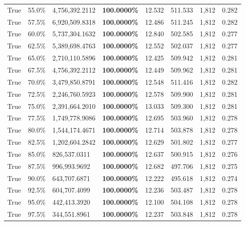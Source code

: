 \begin{table}[H]
\begin{tabular}{lllrllll}
\cline{1-8}
True & 55.0\% & 4,756,392.2112 & \bfseries \color{red} 100.0000\% & 12.532 & 511.533 & 1,812 & 0.282 \\
\cline{1-8}
True & 57.5\% & 6,920,509.8318 & \bfseries \color{red} 100.0000\% & 12.486 & 511.245 & 1,812 & 0.282 \\
\cline{1-8}
True & 60.0\% & 5,737,304.1632 & \bfseries \color{red} 100.0000\% & 12.840 & 502.585 & 1,812 & 0.277 \\
\cline{1-8}
True & 62.5\% & 5,389,698.4763 & \bfseries \color{red} 100.0000\% & 12.552 & 502.037 & 1,812 & 0.277 \\
\cline{1-8}
True & 65.0\% & 2,710,110.5896 & \bfseries \color{red} 100.0000\% & 12.425 & 509.942 & 1,812 & 0.281 \\
\cline{1-8}
True & 67.5\% & 4,756,392.2112 & \bfseries \color{red} 100.0000\% & 12.449 & 509.962 & 1,812 & 0.281 \\
\cline{1-8}
True & 70.0\% & 3,479,850.8791 & \bfseries \color{red} 100.0000\% & 12.548 & 511.416 & 1,812 & 0.282 \\
\cline{1-8}
True & 72.5\% & 2,246,760.5923 & \bfseries \color{red} 100.0000\% & 12.578 & 509.900 & 1,812 & 0.281 \\
\cline{1-8}
True & 75.0\% & 2,391,664.2010 & \bfseries \color{red} 100.0000\% & 13.033 & 509.300 & 1,812 & 0.281 \\
\cline{1-8}
True & 77.5\% & 1,749,778.9086 & \bfseries \color{red} 100.0000\% & 12.695 & 503.960 & 1,812 & 0.278 \\
\cline{1-8}
True & 80.0\% & 1,544,174.4671 & \bfseries \color{red} 100.0000\% & 12.714 & 503.878 & 1,812 & 0.278 \\
\cline{1-8}
True & 82.5\% & 1,202,604.2842 & \bfseries \color{red} 100.0000\% & 12.629 & 501.802 & 1,812 & 0.277 \\
\cline{1-8}
True & 85.0\% & 826,537.0311 & \bfseries \color{red} 100.0000\% & 12.637 & 500.915 & 1,812 & 0.276 \\
\cline{1-8}
True & 87.5\% & 996,993.9692 & \bfseries \color{red} 100.0000\% & 12.682 & 497.706 & 1,812 & 0.275 \\
\cline{1-8}
True & 90.0\% & 643,707.6871 & \bfseries \color{red} 100.0000\% & 12.222 & 495.618 & 1,812 & 0.274 \\
\cline{1-8}
True & 92.5\% & 604,707.4099 & \bfseries \color{red} 100.0000\% & 12.236 & 503.487 & 1,812 & 0.278 \\
\cline{1-8}
True & 95.0\% & 442,413.3920 & \bfseries \color{red} 100.0000\% & 12.100 & 504.108 & 1,812 & 0.278 \\
\cline{1-8}
True & 97.5\% & 344,551.8961 & \bfseries \color{red} 100.0000\% & 12.237 & 503.848 & 1,812 & 0.278 \\
\cline{1-8}
\bottomrule
\end{tabular}
\end{table}
